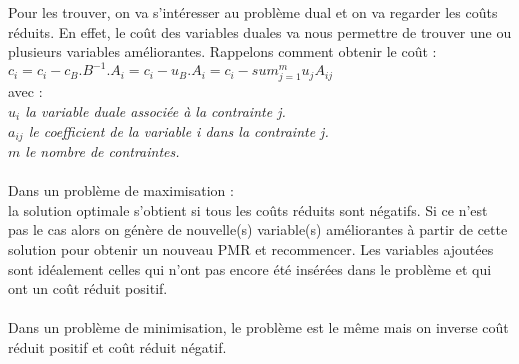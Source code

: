 Pour les trouver, on va s'intéresser  au problème dual et on va regarder les coûts réduits. En effet, le coût des variables duales va nous permettre de trouver une ou plusieurs variables améliorantes.
Rappelons comment obtenir le coût :\\
\hspace*{2.5cm}$c_i = c_i - c_B.B^{-1}.A_i = c_i - u_B.A_i = c_i - sum_{j=1}^{m}{u_j A_{ij}}$\\

avec :\\
\textit{$u_i$ la variable duale associée à la contrainte j.\\
$a_{ij}$ le coefficient de la variable i dans la contrainte j.\\
$m$ le nombre de contraintes.\\}
\\
Dans un problème de maximisation :\\
la solution optimale s'obtient si tous les coûts réduits sont négatifs. Si ce n'est pas le cas alors on génère de nouvelle(s) variable(s) améliorantes à partir de cette solution pour obtenir un nouveau PMR et recommencer. Les variables ajoutées sont idéalement celles qui n'ont pas encore été insérées dans le problème et qui ont un coût réduit positif.\\
\\
Dans un problème de minimisation, le problème est le même mais on inverse coût réduit positif et coût réduit négatif.
